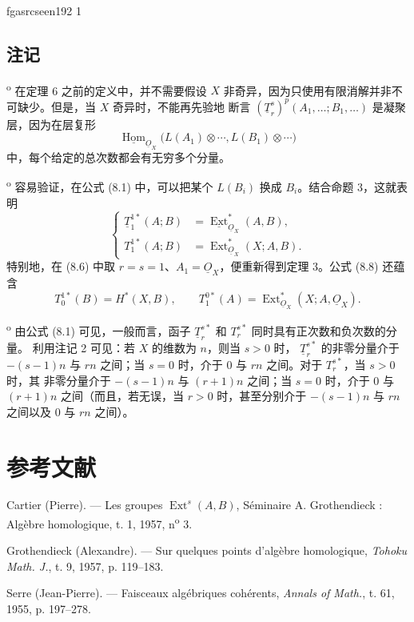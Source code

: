 \documentclass[12pt,twoside,openany]{book}
\numberwithin{equation}{section}
\newcommand{\fgaunitid}{unbound}
\newcommand{\src}[1]{%
  \phantomsection
  \hypertarget{src:\fgaunitid:#1}{}%
  \hypertarget{fga.\fgaunitid.p#1}{}%
  \ifcsname fgasrcseen#1\endcsname\else
    \expandafter\gdef\csname fgasrcseen#1\endcsname{1}%
    \hypertarget{src:#1}{}%
  \fi
  \marginpar{\raggedleft\footnotesize\sffamily #1}%
}
\newcommand{\Osh}{\underline{O}}
\newcommand{\Homsh}{\underline{\operatorname{Hom}}}
\newcommand{\Extsh}{\underline{\operatorname{Ext}}}
\theoremstyle{plain}
\theoremstyle{definition}
\theoremstyle{remark}
\begin{document}
\src{192}
\subsection*{注记}

\textsuperscript{o} 在定理 6 之前的定义中，并不需要假设 $X$
非奇异，因为只使用有限消解并非不可缺少。但是，当 $X$ 奇异时，不能再先验地
断言
$(\underline{T}_{r}^{s})^{p}(A_1,\ldots;B_1,\ldots)$ 是凝聚层，因为在层复形
\[
  \Homsh_{\Osh_X}\bigl(L(A_1)\otimes\cdots,L(B_1)\otimes\cdots\bigr)
\]
中，每个给定的总次数都会有无穷多个分量。

\medskip
{}\textsuperscript{o} 容易验证，在公式 (8.1) 中，可以把某个
$L(B_i)$ 换成 $B_i$。结合命题 3，这就表明
\begin{equation}\tag{8.8}
\left\{
\begin{aligned}
  \underline{T}_{1}^{1*}(A;B)&=\Extsh_{\Osh_X}^{*}(A,B),\\
  T_{1}^{1*}(A;B)&=\operatorname{Ext}_{\Osh_X}^{*}(X;A,B).
\end{aligned}
\right.
\end{equation}
特别地，在 (8.6) 中取 $r=s=1$、$A_1=\Osh_X$，便重新得到定理 3。公式
(8.8) 还蕴含
\[
  T_{0}^{1*}(B)=H^{*}(X,B),
  \qquad
  T_{1}^{0*}(A)=\operatorname{Ext}_{\Osh_X}^{*}(X;A,\Osh_X).
\]

\medskip
{}\textsuperscript{o} 由公式 (8.1) 可见，一般而言，函子
$\underline{T}_{r}^{s*}$ 和 $T_{r}^{s*}$ 同时具有正次数和负次数的分量。
利用注记 2 可见：若 $X$ 的维数为 $n$，则当 $s>0$ 时，
$\underline{T}_{r}^{s*}$ 的非零分量介于 $-(s-1)n$ 与 $rn$ 之间；当
$s=0$ 时，介于 $0$ 与 $rn$ 之间。对于 $T_{r}^{s*}$，当 $s>0$ 时，其
非零分量介于 $-(s-1)n$ 与 $(r+1)n$ 之间；当 $s=0$ 时，介于 $0$ 与
$(r+1)n$ 之间（而且，若无误，当 $r>0$ 时，甚至分别介于 $-(s-1)n$
与 $rn$ 之间以及 $0$ 与 $rn$ 之间）。

\section*{参考文献}

\noindent[1] Cartier (Pierre). --- Les groupes
$\operatorname{Ext}^{s}(A,B)$, Séminaire A. Grothendieck : Algèbre homologique,
t. 1, 1957, n\textsuperscript{o} 3.

\noindent[2] Grothendieck (Alexandre). --- Sur quelques points d'algèbre
homologique, \emph{Tohoku Math. J.}, t. 9, 1957, p. 119--183.

\noindent[3] Serre (Jean-Pierre). --- Faisceaux algébriques cohérents,
\emph{Annals of Math.}, t. 61, 1955, p. 197--278.
\end{document}
